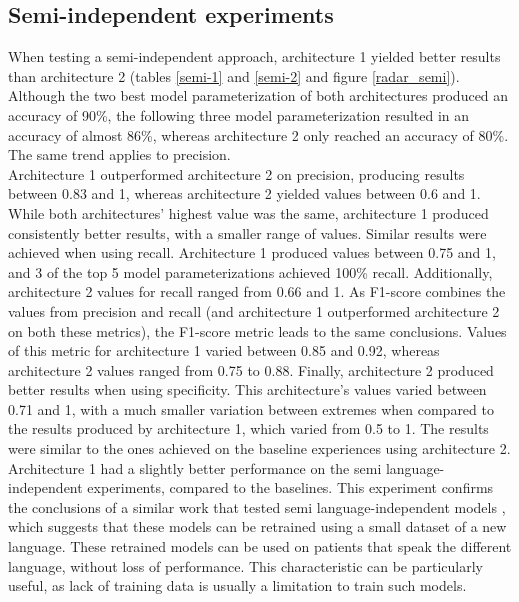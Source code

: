 \subsection{Semi-independent experiments}

When testing a semi-independent approach, architecture 1 yielded better results than architecture 2 (tables \ref{semi-1} and \ref{semi-2} and figure \ref{radar_semi}). Although the two best model parameterization of both architectures produced an accuracy of 90\%, the following three model parameterization resulted in an accuracy of almost 86\%, whereas architecture 2 only reached an accuracy of 80\%. The same trend applies to precision.
\\
Architecture 1 outperformed architecture 2 on precision, producing results between 0.83 and 1, whereas architecture 2 yielded values between 0.6 and 1. While both architectures' highest value was the same, architecture 1 produced consistently better results, with a smaller range of values. Similar results were achieved when using recall. Architecture 1 produced values between 0.75 and 1, and 3 of the top 5 model parameterizations achieved 100\% recall. Additionally, architecture 2 values for recall ranged from 0.66 and 1. As F1-score combines the values from precision and recall (and architecture 1 outperformed architecture 2 on both these metrics), the F1-score metric leads to the same conclusions. Values of this metric for architecture 1 varied between 0.85 and 0.92, whereas architecture 2 values ranged from 0.75 to 0.88. Finally, architecture 2 produced better results when using specificity. This architecture's values varied between 0.71 and 1, with a much smaller variation between extremes when compared to the results produced by architecture 1, which varied from 0.5 to 1. The results were similar to the ones achieved on the baseline experiences using architecture 2. Architecture 1 had a slightly better performance on the semi language-independent experiments, compared to the baselines. This experiment confirms the conclusions of a similar work that tested semi language-independent models \cite{parkinson_three_languages}, which suggests that these models can be retrained using a small dataset of a new language. These retrained models can be used on patients that speak the different language, without loss of performance. This characteristic can be particularly useful, as lack of training data is usually a limitation to train such models.

